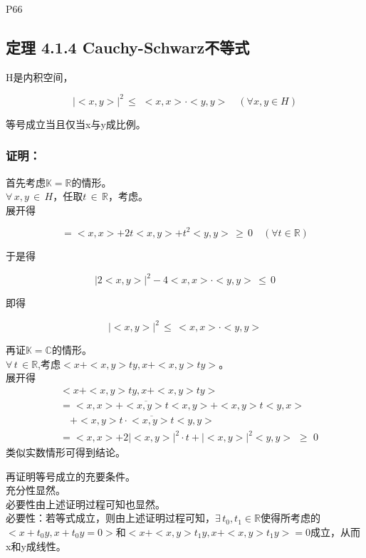 \documentclass[
]{article}
\begin{document}
P66

\hypertarget{ux5b9aux7406-414-cauchy-schwarzux4e0dux7b49ux5f0f}{%
\subsection{\texorpdfstring{\textbf{定理 4.1.4
Cauchy-Schwarz不等式}}{定理 4.1.4 Cauchy-Schwarz不等式}}\label{ux5b9aux7406-414-cauchy-schwarzux4e0dux7b49ux5f0f}}

H是内积空间，

\[|<x,y>|^{2} \, \leq \, \,<x,x>\cdot<y,y>\quad (\forall x,y\in H)\]

等号成立当且仅当x与y成比例。

\hypertarget{ux8bc1ux660e-3}{%
\subsubsection{\texorpdfstring{\textbf{证明：}}{证明：}}\label{ux8bc1ux660e-3}}

首先考虑\(\mathbb K=\mathbb R\)的情形。\\
\(\forall \, x,y \, \in \, H\)，任取\(t\, \in \, \mathbb R\)，考虑\(<x+ty,x+ty>\)。\\
展开得

\[<x+ty,x+ty>=<x,x>+2t<x,y>+t^{2}<y,y> \, \geq \, 0\quad (\forall t\in\mathbb R)\]

于是得

\[|2<x,y>|^{2}-4<x,x>\cdot<y,y>\, \leq \, 0\]

即得

\[|<x,y>|^{2} \, \leq \, <x,x>\cdot<y,y>\]

再证\(\mathbb K=\mathbb C\)的情形。\\
\(\forall \, t \, \in \mathbb R\),考虑\(<x+<x,y>ty,x+<x,y>ty>\)。\\
展开得
\[
\begin{aligned}
&<x+<x,y>ty,x+<x,y>ty>\\
&=<x,x>+\overline{<x,y>t}<x,y>+<x,y>t<y,x>\\
&{\quad}+<x,y>t\cdot\overline{<x,y>t}<y,y>\\
&=<x,x>+2|<x,y>|^{2}\cdot t+|<x,y>|^{2}<y,y>\,\,\geq\,\,0
\end{aligned}
\]
类似实数情形可得到结论。

再证明等号成立的充要条件。\\
充分性显然。\\
必要性由上述证明过程可知也显然。\\
必要性：若等式成立，则由上述证明过程可知，\(\exists \, t_{0},t_{1}\in \mathbb R\)使得所考虑的\(<x+t_{0}y,x+t_{0}y=0>\)和\(<x+<x,y>t_{1}y,x+<x,y>t_{1}y>=0\)成立，从而x和y成线性。
\end{document}

